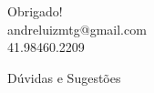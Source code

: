\documentclass[
presentation.tex
]{subfiles}
\begin{document}

{
	\begin{frame}[standout]
		Obrigado! \\
		andreluizmtg@gmail.com\\
		41.98460.2209
	\end{frame}
}


{
	\begin{frame}[standout]
		Dúvidas e Sugestões
	\end{frame}
	}
\end{document}
